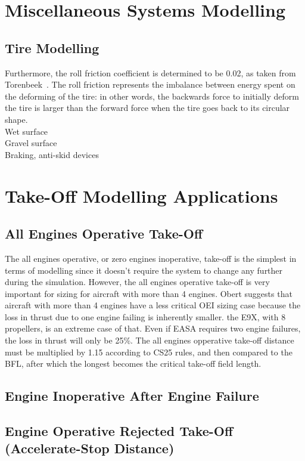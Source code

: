 \section{Miscellaneous Systems Modelling}
\subsection{Tire Modelling}
Furthermore, the roll friction coefficient is determined to be 0.02, as taken from Torenbeek~\cite{torenbeek2013synthesis}. The roll friction represents the imbalance between energy spent on the deforming of the tire: in other words, the backwards force to initially deform the tire is larger than the forward force when the tire goes back to its circular shape.\\
Wet surface\\
Gravel surface\\
Braking, anti-skid devices\\

\section{Take-Off Modelling Applications}

\subsection{All Engines Operative Take-Off}
The all engines operative, or zero engines inoperative, take-off is the simplest in terms of modelling since it doesn't require the system to change any further during the simulation. However, the all engines operative take-off is very important for sizing for aircraft with more than 4 engines. Obert suggests that aircraft with more than 4 engines have a less critical OEI sizing case because the loss in thrust due to one engine failing is inherently smaller. the E9X, with 8 propellers, is an extreme case of that. Even if EASA requires two engine failures, the loss in thrust will only be 25\%. The all engines opperative take-off distance must be multiplied by 1.15 according to CS25 rules, and then compared to the BFL, after which the longest becomes the critical take-off field length.

\subsection{Engine Inoperative After Engine Failure}

\subsection{Engine Operative Rejected Take-Off (Accelerate-Stop Distance)}

